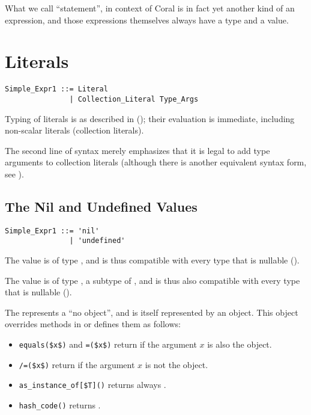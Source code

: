 What we call ``statement'', in context of Coral is in fact yet another kind of an expression, and those expressions themselves always have a type and a value. 





\section{Literals}

\syntax\begin{lstlisting}
Simple_Expr1 ::= Literal
               | Collection_Literal Type_Args
\end{lstlisting}

Typing of literals is as described in (); their evaluation is immediate, including non-scalar literals (collection literals). 

The second line of syntax merely emphasizes that it is legal to add type arguments to collection literals (although there is another equivalent syntax form, see ). 






\subsection{The Nil and Undefined Values}

\syntax\begin{lstlisting}
Simple_Expr1 ::= 'nil'
               | 'undefined'
\end{lstlisting}

The  value is of type , and is thus compatible with every type that is nullable ().

The  value is of type , a subtype of , and is thus also compatible with every type that is nullable (). 

The  represents a ``no object'', and is itself represented by an object. This object overrides methods in  or defines them as follows: 
\begin{itemize}
  \item \lstinline!equals($x$)! and \lstinline!=($x$)! return  if the argument $x$ is also the  object. 

  \item \lstinline!/=($x$)! return  if the argument $x$ is not the  object.

  \item \lstinline[mathescape=false]!as_instance_of[$T]()! returns always . 

  \item \lstinline!hash_code()! returns . 
\end{itemize}

